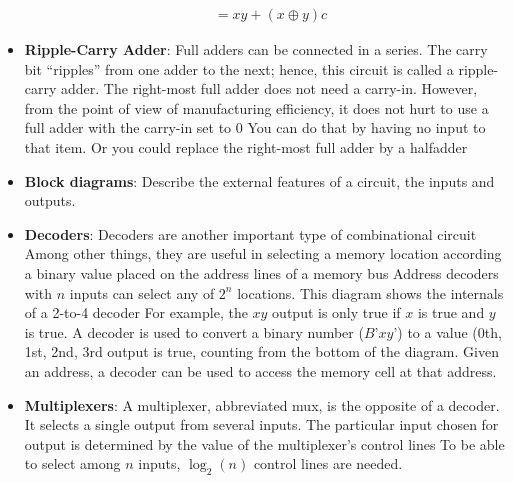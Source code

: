 \documentclass{report}
\begin{document}
\begin{itemize}
\begin{align*}
                &=xy + (x \oplus y)c
            \end{align*}
        \item \textbf{Ripple-Carry Adder}: 
            Full adders can be connected in a series. The carry bit “ripples” from one adder to the next; hence, this circuit is called a ripple-carry adder.
            \bigbreak \noindent 
            \bigbreak \noindent 
            The right-most full adder does not need a carry-in. However, from the point of view of manufacturing efficiency, it does not hurt to use a full adder with the carry-in set to 0
            \bigbreak \noindent 
            You can do that by having no input to that item. Or you could replace the right-most full adder by a halfadder
        \item \textbf{Block diagrams}: Describe the external features of a circuit, the inputs and outputs.
        \item \textbf{Decoders}:
            Decoders are another important type of combinational circuit
            \bigbreak \noindent 
            Among other things, they are useful in selecting a memory location according a binary value placed on the address lines of a memory bus
            \bigbreak \noindent 
            Address decoders with $n$ inputs can select any of $2^{n}$ locations.
            \bigbreak \noindent 
            \bigbreak \noindent 
            This diagram shows the internals of a 2-to-4 decoder
            \bigbreak \noindent 
            \bigbreak \noindent 
            For example, the $xy$ output is only true if $x$ is true and $y$ is true.
            \bigbreak \noindent 
            A decoder is used to convert a binary number ($B’xy’$) to a value (0th, 1st, 2nd, 3rd output is true, counting from the bottom of the diagram.
            \bigbreak \noindent 
            Given an address, a decoder can be used to access the memory cell at that address.
        \item \textbf{Multiplexers}: A multiplexer, abbreviated mux, is the opposite of a decoder. It selects a single output from several inputs. The particular input chosen for output is determined by the value of the multiplexer’s control lines
            \bigbreak \noindent 
            To be able to select among $n$ inputs, $\log_{2}(n) $ control lines are needed.
            \bigbreak \noindent 

\end{itemize}
\end{document}
